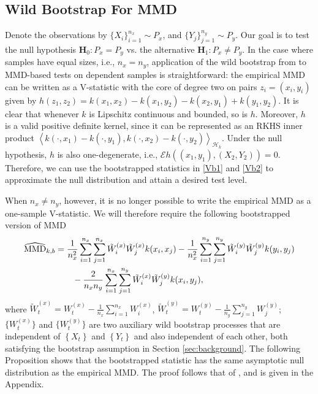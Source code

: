 \documentclass{article} %
\newcommand{\ev}{\mathcal{E}}
\newcommand{\Hk}{\ensuremath{\mathcal{H}_k}}%
\begin{document}
\subsection{Wild Bootstrap For MMD}
\vspace{-2mm}
Denote the observations by $\{X_i\}_{i=1}^{n_x}\sim P_x$, and $\{Y_j\}_{j=1}^{n_y}\sim P_y$. Our goal is to test the null hypothesis $\mathbf H_0: P_x=P_y$ vs. 
the alternative $\mathbf H_1: P_x\neq P_y$. In the case where samples have equal sizes, i.e., $n_x=n_y$, application of the wild bootstrap from \cite{leucht_dependent_2013} to MMD-based tests on dependent samples is straightforward: the empirical MMD can be written as a V-statistic with the core of degree two on pairs $z_i=(x_i,y_i)$ given by $h(z_1,z_2) = k(x_1,x_2)- k(x_1,y_2) - k(x_2,y_1) + k(y_1,y_2)$. It is clear that whenever $k$ is Lipschitz continuous and bounded, so is $h$. Moreover, $h$ is a valid positive definite kernel, since it can be represented as an RKHS inner product  $\left\langle k(\cdot, x_1) -k(\cdot, y_1),k(\cdot, x_2) -k(\cdot, y_2) \right\rangle_{\Hk}$. Under the null hypothesis, $h$ is also one-degenerate, i.e., $\ev h\left((x_1,y_1),(X_2,Y_2)\right) = 0$. Therefore, we can use the bootstrapped statistics in \eqref{Vb1} and \eqref{Vb2} to approximate the null distribution and attain a desired test level.

When $n_x\neq n_y$, however, it is no longer possible to write the empirical MMD
as a one-sample V-statistic. We will therefore require the following bootstrapped version of MMD
\begin{align}
\widehat{\text{MMD}}_{k,b}&=\frac{1}{n_x^2}\sum_{i=1}^{n_x}\sum_{j=1}^{n_x}\tilde W_i^{(x)}\tilde W_j^{(x)}k(x_i,x_j)-\frac{1}{n_x^2}\sum_{i=1}^{n_y}\sum_{j=1}^{n_y}\tilde W_i^{(y)}\tilde W_j^{(y)}k(y_i,y_j)\notag\\
{}&\qquad-\frac{2}{n_x n_y}\sum_{i=1}^{n_x}\sum_{j=1}^{n_y}\tilde W_i^{(x)}\tilde W_j^{(y)}k(x_i,y_j),\label{eq:mmdkb}
\end{align}
where $\tilde W_t^{(x)}=W_t^{(x)}-\frac{1}{n_x}\sum_{i=1}^{n_x}W_i^{(x)}$, $\tilde W_t^{(y)}=W_t^{(y)}-\frac{1}{n_y}\sum_{j=1}^{n_y}W_j^{(y)}$;  $\{W_t^{(x)}\}$ and $\{W_t^{(y)}\}$ are two auxiliary wild bootstrap processes that are independent of $\left\{ X_t \right\}$ and $\left\{ Y_t \right\}$ and also independent of each other, both satisfying the bootstrap assumption in Section \ref{sec:background}.  
The following Proposition shows that the bootstrapped statistic has the same asymptotic null distribution as the empirical MMD. The proof follows that of \cite[Theorem 3.1]{leucht_dependent_2013}, and is given in the Appendix.
\end{document}
